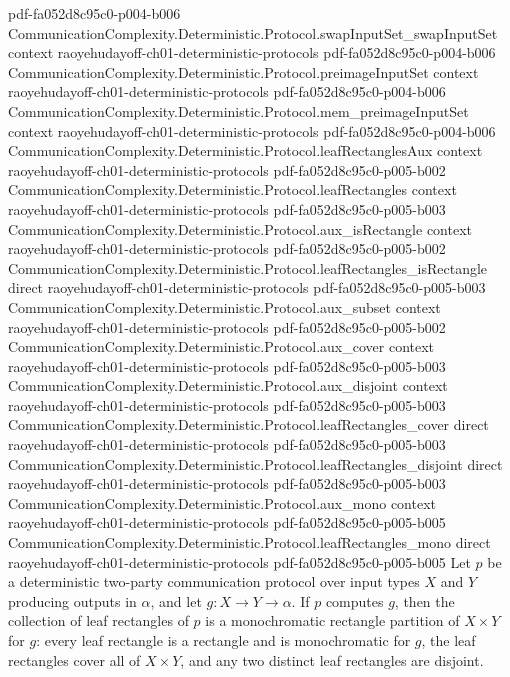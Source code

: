 \begin{theorem}
  {pdf-fa052d8c95c0-p004-b006}
\proofstep
  {CommunicationComplexity.Deterministic.Protocol.swapInputSet_swapInputSet}
  {context}
  {raoyehudayoff-ch01-deterministic-protocols}
  {pdf-fa052d8c95c0-p004-b006}
\proofstep
  {CommunicationComplexity.Deterministic.Protocol.preimageInputSet}
  {context}
  {raoyehudayoff-ch01-deterministic-protocols}
  {pdf-fa052d8c95c0-p004-b006}
\proofstep
  {CommunicationComplexity.Deterministic.Protocol.mem_preimageInputSet}
  {context}
  {raoyehudayoff-ch01-deterministic-protocols}
  {pdf-fa052d8c95c0-p004-b006}
\proofstep
  {CommunicationComplexity.Deterministic.Protocol.leafRectanglesAux}
  {context}
  {raoyehudayoff-ch01-deterministic-protocols}
  {pdf-fa052d8c95c0-p005-b002}
\proofstep
  {CommunicationComplexity.Deterministic.Protocol.leafRectangles}
  {context}
  {raoyehudayoff-ch01-deterministic-protocols}
  {pdf-fa052d8c95c0-p005-b003}
\proofstep
  {CommunicationComplexity.Deterministic.Protocol.aux_isRectangle}
  {context}
  {raoyehudayoff-ch01-deterministic-protocols}
  {pdf-fa052d8c95c0-p005-b002}
\proofstep
  {CommunicationComplexity.Deterministic.Protocol.leafRectangles_isRectangle}
  {direct}
  {raoyehudayoff-ch01-deterministic-protocols}
  {pdf-fa052d8c95c0-p005-b003}
\proofstep
  {CommunicationComplexity.Deterministic.Protocol.aux_subset}
  {context}
  {raoyehudayoff-ch01-deterministic-protocols}
  {pdf-fa052d8c95c0-p005-b002}
\proofstep
  {CommunicationComplexity.Deterministic.Protocol.aux_cover}
  {context}
  {raoyehudayoff-ch01-deterministic-protocols}
  {pdf-fa052d8c95c0-p005-b003}
\proofstep
  {CommunicationComplexity.Deterministic.Protocol.aux_disjoint}
  {context}
  {raoyehudayoff-ch01-deterministic-protocols}
  {pdf-fa052d8c95c0-p005-b003}
\proofstep
  {CommunicationComplexity.Deterministic.Protocol.leafRectangles_cover}
  {direct}
  {raoyehudayoff-ch01-deterministic-protocols}
  {pdf-fa052d8c95c0-p005-b003}
\proofstep
  {CommunicationComplexity.Deterministic.Protocol.leafRectangles_disjoint}
  {direct}
  {raoyehudayoff-ch01-deterministic-protocols}
  {pdf-fa052d8c95c0-p005-b003}
\proofstep
  {CommunicationComplexity.Deterministic.Protocol.aux_mono}
  {context}
  {raoyehudayoff-ch01-deterministic-protocols}
  {pdf-fa052d8c95c0-p005-b005}
\proofstep
  {CommunicationComplexity.Deterministic.Protocol.leafRectangles_mono}
  {direct}
  {raoyehudayoff-ch01-deterministic-protocols}
  {pdf-fa052d8c95c0-p005-b005}
Let $p$ be a deterministic two-party communication protocol over input types $X$ and $Y$
producing outputs in $\alpha$, and let $g : X \to Y \to \alpha$. If $p$ computes $g$,
then the collection of leaf rectangles of $p$ is a monochromatic rectangle partition of
$X \times Y$ for $g$: every leaf rectangle is a rectangle and is monochromatic for $g$,
the leaf rectangles cover all of $X \times Y$, and any two distinct leaf rectangles are
disjoint.
\end{theorem}

